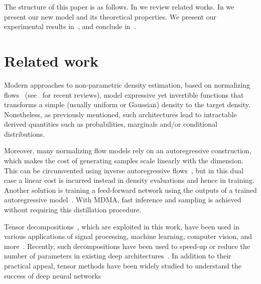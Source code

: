 \documentclass{article}
\begin{document}
The structure of this paper is as follows. In  we 
review related works. In  we
present our new model and its theoretical properties.
We present our experimental results in~, and 
conclude in~. 


 

\section{Related work}
\label{sec:related}

Modern approaches to non-parametric density estimation, 
based on normalizing flows~\cite{kingma2018,huang2018neural,oliva2018transformation,grathwohl2018ffjord,de2020block,bigdeli2020learning} (see~\cite{kobyzev2020normalizing,papamakarios2021normalizing} for recent reviews), model expressive yet invertible functions that transforms a simple (usually uniform or Gaussian) density to the target density.
Nonetheless, as previously mentioned, such architectures 
lead to intractable derived quantities such as probabilities, marginals and/or conditional distributions.

Moreover, many normalizing flow models rely on an autoregressive construction, 
which makes the cost of generating samples scale linearly with the dimension.
This can be circumvented using inverse autoregressive flows~\cite{kingma2016improving}, but in this dual case a linear cost 
is incurred instead in density evaluations and hence in training. Another solution is training a feed-forward network using the outputs of a trained autoregressive model~\cite{oord2018parallel}. With MDMA, fast inference and sampling is achieved without requiring this distillation procedure. 




Tensor decompositions~\cite{hackbusch2012tensor,cichocki2016tensor}, 
which are exploited in this work, have been used in various applications 
of signal processing, machine learning, computer vision, and more~\cite{vasilescu2002multilinear,cichocki2009nonnegative,anandkumar2014tensor,papalexakis2016tensors,sidiropoulos2017tensor}.
Recently, such decompositions have been used to speed-up or reduce the number of parameters in existing deep architectures~\cite{lebedev2014speeding,tai2015convolutional,novikov2015tensorizing,kim2015compression,yang2016deep,chen2018sharing}.
In addition to their practical appeal, 
tensor methods have been widely studied to understand the success of deep neural networks \cite{cohen2016expressive,haeffele2015global,janzamin2015generalization,janzamin2015beating,sharir2017expressive}
\end{document}
